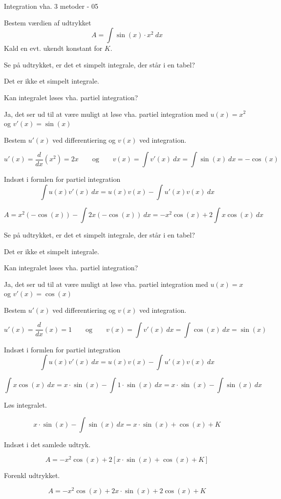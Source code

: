 \documentclass{article}
\begin{document}
\newpage

\begin{exercise}{Integration vha. 3 metoder - 05}

Bestem værdien af udtrykket
\[
A = \int \sin(x)\cdot x^2 \ dx
\]
Kald en evt. ukendt konstant for $K$.


\hint
Se på udtrykket, er det et simpelt integrale, der står i en tabel?

\hint
Det er ikke et simpelt integrale.

\hint
Kan integralet løses vha. partiel integration?

\hint
Ja, det ser ud til at være muligt at løse vha. partiel integration med $u(x)=x^2$ og $v'(x)=\sin(x)$

\hint
Bestem $u'(x)$ ved differentiering og $v(x)$ ved integration.

\hint
\[
u'(x) = \frac{d}{dx} \left( x^2 \right) = 2x \qquad \textrm{og} \qquad v(x) = \int v'(x) \ dx = \int \sin(x) \ dx = - \cos(x)
\]

\hint
Indsæt i formlen for partiel integration
\[
\int u(x) v'(x) \ dx = u(x) v(x) - \int u'(x) v(x) \ dx
\]

\hint
\[
A = x^2 (- \cos(x)) - \int 2x (- \cos(x)) \ dx = -x^2 \cos(x) + 2 \int x \cos(x) \ dx
\]

\hint
Se på udtrykket, er det et simpelt integrale, der står i en tabel?

\hint
Det er ikke et simpelt integrale.

\hint
Kan integralet løses vha. partiel integration?

\hint
Ja, det ser ud til at være muligt at løse vha. partiel integration med $u(x)=x$ og $v'(x)=\cos(x)$

\hint
Bestem $u'(x)$ ved differentiering og $v(x)$ ved integration.

\hint
\[
u'(x) = \frac{d}{dx} \left( x \right) = 1 \qquad \textrm{og} \qquad v(x) = \int v'(x) \ dx = \int \cos(x) \ dx = \sin(x)
\]

\hint
Indsæt i formlen for partiel integration
\[
\int u(x) v'(x) \ dx = u(x) v(x) - \int u'(x) v(x) \ dx
\]

\hint
\[
\int x \cos(x) \ dx = x \cdot \sin(x) - \int 1 \cdot \sin(x) \ dx = x \cdot \sin(x) - \int \sin(x) \ dx
\]

\hint
Løs integralet.

\hint
\[
x \cdot \sin(x) - \int \sin(x) \ dx = x \cdot \sin(x) + \cos(x) + K
\]

\hint
Indsæt i det samlede udtryk.

\hint
\[
A = -x^2 \cos(x) + 2 \left[x \cdot \sin(x) + \cos(x) + K \right]
\]

\hint
Forenkl udtrykket.

\hint
\[
A = -x^2 \cos(x) + 2x \cdot \sin(x) + 2\cos(x) + K
\]


\end{exercise}
\end{document}
